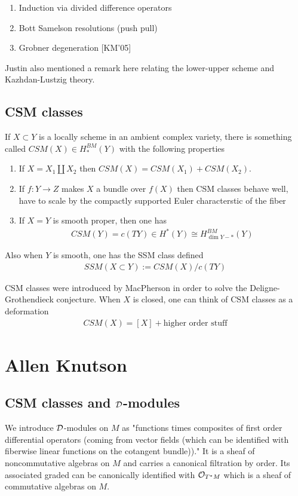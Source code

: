 \documentclass[12pt]{article}
\begin{document}
\begin{enumerate}
    \item Induction via divided difference operators
    \item Bott Samelson resolutions (push pull)
    \item Grobner degeneration [KM'05]
\end{enumerate}
\begin{remark}
    Justin also mentioned a remark here relating the lower-upper scheme and Kazhdan-Lustzig theory.
\end{remark}

\subsection{CSM classes}
If $X\subset Y$ is a locally scheme in an ambient complex variety, there is something called $CSM(X) \in H_*^{BM}(Y)$ with the following properties \begin{enumerate}
    \item If $X = X_1 \coprod X_2$ then $CSM(X) = CSM(X_1) + CSM(X_2)$.
    \item If $f:Y\to Z$ makes $X$ a bundle over $f(X)$ then CSM classes behave well, have to scale by the compactly supported Euler characterstic of the fiber
    \item If $X = Y$ is smooth proper, then one has \begin{align*}
        CSM(Y) = c(TY) \in H^*(Y) \cong H^{BM}_{\dim Y - *}(Y)
    \end{align*}
\end{enumerate}
Also when $Y$ is smooth, one has the SSM class defined \begin{align*}
    SSM(X\subset Y) := CSM(X)/c(TY)
\end{align*}

CSM classes were introduced by MacPherson in order to solve the Deligne-Grothendieck conjecture. When $X$ is closed, one can think of CSM classes as a deformation \begin{align*}
    CSM(X) = [X] + \text{higher order stuff}
\end{align*}

\section{Allen Knutson}
\subsection{CSM classes and ${\mathcal{D}}$-modules}
We introduce ${\mathcal{D}}$-modules on $M$ as "functions times composites of first order differential operators (coming from vector fields (which can be identified with fiberwise linear functions on the cotangent bundle))." It is a sheaf of noncommutative algebras on $M$ and carries a canonical filtration by order. Its associated graded can be canonically identified with ${\mathcal{O}}_{T^*M}$ which is a sheaf of commutative algebras on $M$.
\end{document}
